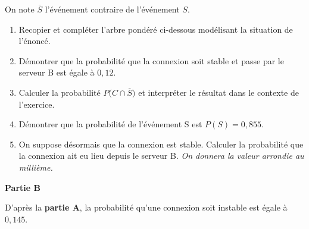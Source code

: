 On note $\overline{S}$ l'événement contraire de l'événement $S$.

\begin{enumerate}
	\item Recopier et compléter l'arbre pondéré ci-dessous modélisant la situation de l'énoncé.
	
	\begin{Centrage}
	\end{Centrage}
	\item Démontrer que la probabilité que la connexion soit stable et passe par le serveur B est égale à $0,12$.
	\item Calculer la probabilité $P\big(C \cap \overline{S}\big)$ et interpréter le résultat dans le contexte de l'exercice.
	\item Démontrer que la probabilité de l'événement S est $P(S)=0,855$.
	\item On suppose désormais que la connexion est stable. Calculer la probabilité que la connexion ait eu lieu depuis le serveur B. \textit{On donnera la valeur arrondie au millième.}
\end{enumerate}

\begin{center}
	\textbf{Partie B}
\end{center}

D'après la \textbf{partie A}, la probabilité qu'une connexion soit instable est égale à $0,145$.

